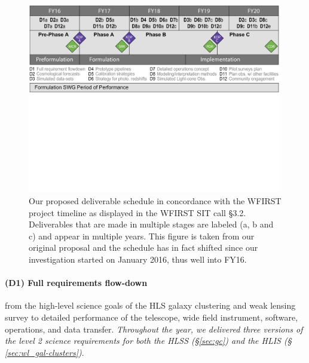 \begin{figure}
\includegraphics[width=0.99\textwidth]{Plots/wfirst_milestones_v2.pdf}
\caption{Our proposed deliverable schedule in concordance with the WFIRST
project timeline as displayed in the WFIRST SIT call \S 3.2. Deliverables that
are made in multiple stages are labeled (a, b and c) and appear in multiple
years. This figure is taken from our original proposal and the schedule has in
fact shifted since our investigation started on January 2016, thus well into
FY16.} \label{tab:milestones_mgt}
\end{figure}

\paragraph*{(D1) Full requirements flow-down} from the high-level science goals
of the HLS galaxy clustering and weak lensing survey to detailed performance of
the telescope, wide field instrument, software, operations, and data transfer.
\emph{Throughout the year, we delivered three versions of the level 2 science
requirements for both the HLSS (\S \ref{sec:gc}) and the HLIS (\S
\ref{sec:wl_gal-clusters})}.

